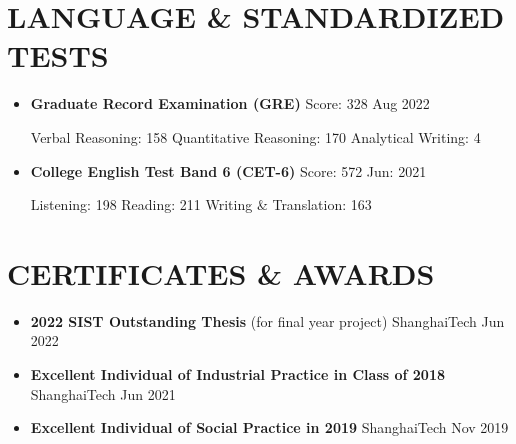 \documentclass[a4paper,10pt]{ctexart} %
\begin{document}
\section{LANGUAGE \& STANDARDIZED TESTS}

    \begin{itemize}
        \item \textbf{Graduate Record Examination (GRE)} \quad Score: 328 \hfill Aug 2022 \\
        \begin{small}
            Verbal Reasoning: 158 \quad Quantitative Reasoning: 170 \quad Analytical Writing: 4
        \end{small}
        \item \textbf{College English Test Band 6 (CET-6)} \quad Score: 572 \hfill Jun: 2021 \\
        \begin{small}
            Listening: 198 \quad Reading: 211 \quad Writing \& Translation: 163
        \end{small}
    \end{itemize}


\newpage



\section{CERTIFICATES \& AWARDS}

    \begin{itemize}
        \item \textbf{2022 SIST Outstanding Thesis} {\small (for final year project)} \hfill ShanghaiTech \quad Jun 2022
        \item \textbf{Excellent Individual of Industrial Practice in Class of 2018} \hfill ShanghaiTech \quad Jun 2021
        \item \textbf{Excellent Individual of Social Practice in 2019} \hfill ShanghaiTech \quad Nov 2019
    \end{itemize}
\end{document}
